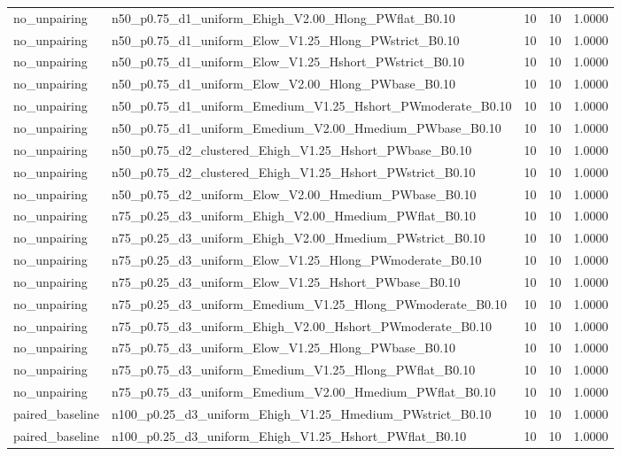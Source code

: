 \begin{tabular}{llrrr}
no_unpairing & n50_p0.75_d1_uniform_Ehigh_V2.00_Hlong_PWflat_B0.10 & 10 & 10 & 1.0000 \\
no_unpairing & n50_p0.75_d1_uniform_Elow_V1.25_Hlong_PWstrict_B0.10 & 10 & 10 & 1.0000 \\
no_unpairing & n50_p0.75_d1_uniform_Elow_V1.25_Hshort_PWstrict_B0.10 & 10 & 10 & 1.0000 \\
no_unpairing & n50_p0.75_d1_uniform_Elow_V2.00_Hlong_PWbase_B0.10 & 10 & 10 & 1.0000 \\
no_unpairing & n50_p0.75_d1_uniform_Emedium_V1.25_Hshort_PWmoderate_B0.10 & 10 & 10 & 1.0000 \\
no_unpairing & n50_p0.75_d1_uniform_Emedium_V2.00_Hmedium_PWbase_B0.10 & 10 & 10 & 1.0000 \\
no_unpairing & n50_p0.75_d2_clustered_Ehigh_V1.25_Hshort_PWbase_B0.10 & 10 & 10 & 1.0000 \\
no_unpairing & n50_p0.75_d2_clustered_Ehigh_V1.25_Hshort_PWstrict_B0.10 & 10 & 10 & 1.0000 \\
no_unpairing & n50_p0.75_d2_uniform_Elow_V2.00_Hmedium_PWbase_B0.10 & 10 & 10 & 1.0000 \\
no_unpairing & n75_p0.25_d3_uniform_Ehigh_V2.00_Hmedium_PWflat_B0.10 & 10 & 10 & 1.0000 \\
no_unpairing & n75_p0.25_d3_uniform_Ehigh_V2.00_Hmedium_PWstrict_B0.10 & 10 & 10 & 1.0000 \\
no_unpairing & n75_p0.25_d3_uniform_Elow_V1.25_Hlong_PWmoderate_B0.10 & 10 & 10 & 1.0000 \\
no_unpairing & n75_p0.25_d3_uniform_Elow_V1.25_Hshort_PWbase_B0.10 & 10 & 10 & 1.0000 \\
no_unpairing & n75_p0.25_d3_uniform_Emedium_V1.25_Hlong_PWmoderate_B0.10 & 10 & 10 & 1.0000 \\
no_unpairing & n75_p0.75_d3_uniform_Ehigh_V2.00_Hshort_PWmoderate_B0.10 & 10 & 10 & 1.0000 \\
no_unpairing & n75_p0.75_d3_uniform_Elow_V1.25_Hlong_PWbase_B0.10 & 10 & 10 & 1.0000 \\
no_unpairing & n75_p0.75_d3_uniform_Emedium_V1.25_Hlong_PWflat_B0.10 & 10 & 10 & 1.0000 \\
no_unpairing & n75_p0.75_d3_uniform_Emedium_V2.00_Hmedium_PWflat_B0.10 & 10 & 10 & 1.0000 \\
paired_baseline & n100_p0.25_d3_uniform_Ehigh_V1.25_Hmedium_PWstrict_B0.10 & 10 & 10 & 1.0000 \\
paired_baseline & n100_p0.25_d3_uniform_Ehigh_V1.25_Hshort_PWflat_B0.10 & 10 & 10 & 1.0000 \\

\end{tabular}
